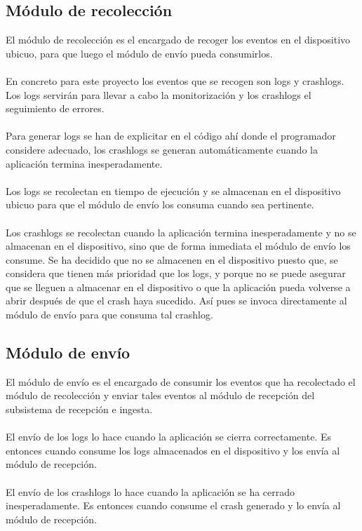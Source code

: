 \subsection{Módulo de recolección}
El módulo de recolección es el encargado de recoger los eventos en el dispositivo ubicuo, para que luego el módulo de envío pueda consumirlos. 
\\\\
En concreto para este proyecto los eventos que se recogen son logs y crashlogs. Los logs servirán para llevar a cabo la monitorización y los crashlogs el seguimiento de errores.
\\\\
Para generar logs se han de explicitar en el código ahí donde el programador considere adecuado, los crashlogs se generan automáticamente cuando la aplicación termina inesperadamente.
\\\\
Los logs se recolectan en tiempo de ejecución y se almacenan en el dispositivo ubicuo para que el módulo de envío los consuma cuando sea pertinente.
\\\\
Los crashlogs se recolectan cuando la aplicación termina inesperadamente y no se almacenan en el dispositivo, sino que de forma inmediata el módulo de envío los consume. Se ha decidido que no se almacenen en el dispositivo puesto que, se considera que tienen más prioridad que los logs, y porque no se puede asegurar que se lleguen a almacenar en el dispositivo o que la aplicación pueda volverse a abrir después de que el crash haya sucedido. Así pues se invoca directamente al módulo de envío para que consuma tal crashlog.

\subsection{Módulo de envío}
El módulo de envío es el encargado de consumir los eventos que ha recolectado el módulo de recolección y enviar tales eventos al módulo de recepción del subsistema de recepción e ingesta.
\\\\
El envío de los logs lo hace cuando la aplicación se cierra correctamente. Es entonces cuando consume los logs almacenados en el dispositivo y los envía al módulo de recepción.
\\\\
El envío de los crashlogs lo hace cuando la aplicación se ha cerrado inesperadamente. Es entonces cuando consume el crash generado y lo envía al módulo de recepción.

